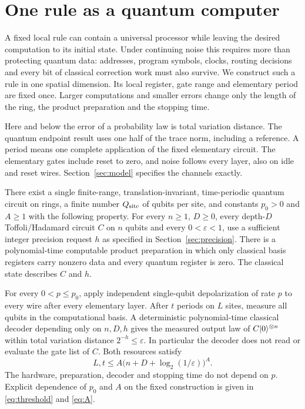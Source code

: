 \section{One rule as a quantum computer}\label{sec:intro}
A fixed local rule can contain a universal processor while leaving the desired computation to its initial state. Under continuing noise this requires more than protecting quantum data: addresses, program symbols, clocks, routing decisions and every bit of classical correction work must also survive. We construct such a rule in one spatial dimension. Its local register, gate range and elementary period are fixed once. Larger computations and smaller errors change only the length of the ring, the product preparation and the stopping time.

Here and below the error of a probability law is total variation distance. The quantum endpoint result uses one half of the trace norm, including a reference. A period means one complete application of the fixed elementary circuit. The elementary gates include reset to zero, and noise follows every layer, also on idle and reset wires. Section~\ref{sec:model} specifies the channels exactly.

\begin{maintheorem}\label{thm:main}
There exist a single finite-range, translation-invariant, time-periodic quantum circuit on rings, a finite number $Q_{\rm site}$ of qubits per site, and constants $p_0>0$ and $A\ge1$ with the following property. For every $n\ge1$, $D\ge0$, every depth-$D$ Toffoli/Hadamard circuit $C$ on $n$ qubits and every $0<\varepsilon<1$, use a sufficient integer precision request $h$ as specified in Section~\ref{sec:precision}. There is a polynomial-time computable product preparation in which only classical basis registers carry nonzero data and every quantum register is zero. The classical state describes $C$ and $h$.

For every $0<p\le p_0$, apply independent single-qubit depolarization of rate $p$ to every wire after every elementary layer. After $t$ periods on $L$ sites, measure all qubits in the computational basis. A deterministic polynomial-time classical decoder depending only on $n,D,h$ gives the measured output law of $C\lvert 0\rangle^{\otimes n}$ within total variation distance $2^{-h}\le\varepsilon$. In particular the decoder does not read or evaluate the gate list of $C$. Both resources satisfy
\begin{equation}\label{eq:resource}
 L,t\le A\bigl(n+D+\log_2(1/\varepsilon)\bigr)^A.
\end{equation}
The hardware, preparation, decoder and stopping time do not depend on $p$. Explicit dependence of $p_0$ and $A$ on the fixed construction is given in \eqref{eq:threshold} and \eqref{eq:A}.
\end{maintheorem}

